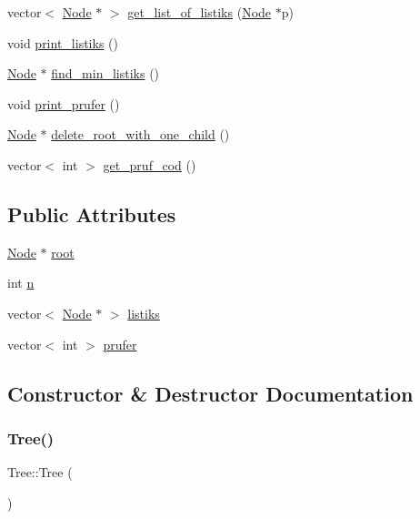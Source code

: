 \begin{DoxyCompactItemize}
\item 
vector$<$ \mbox{\hyperlink{class_node}{Node}} $\ast$ $>$ \mbox{\hyperlink{class_tree_a1feaf70139e6802c0b940c7c7fae9299}{get\+\_\+list\+\_\+of\+\_\+listiks}} (\mbox{\hyperlink{class_node}{Node}} $\ast$p)
\item 
void \mbox{\hyperlink{class_tree_ac2c37627e5e75085896379f2855d4306}{print\+\_\+listiks}} ()
\item 
\mbox{\hyperlink{class_node}{Node}} $\ast$ \mbox{\hyperlink{class_tree_ab640efe82cc69b28a9ddd61ac4410a89}{find\+\_\+min\+\_\+listiks}} ()
\item 
void \mbox{\hyperlink{class_tree_a5b7c6c2e01f8787b9ce3fb1684fc847b}{print\+\_\+prufer}} ()
\item 
\mbox{\hyperlink{class_node}{Node}} $\ast$ \mbox{\hyperlink{class_tree_ae0a6d8260dafecfd861410bfee87a868}{delete\+\_\+root\+\_\+with\+\_\+one\+\_\+child}} ()
\item 
vector$<$ int $>$ \mbox{\hyperlink{class_tree_a723ce7ab4f1030e95a959e11a22833e7}{get\+\_\+pruf\+\_\+cod}} ()
\end{DoxyCompactItemize}
\subsection*{Public Attributes}
\begin{DoxyCompactItemize}
\item 
\mbox{\hyperlink{class_node}{Node}} $\ast$ \mbox{\hyperlink{class_tree_ad8e46ce0aead5778cbdd784d1e370d5f}{root}}
\item 
int \mbox{\hyperlink{class_tree_af99cb1765b0249e5d79541313199786c}{n}}
\item 
vector$<$ \mbox{\hyperlink{class_node}{Node}} $\ast$ $>$ \mbox{\hyperlink{class_tree_ab4f6271eb3d30383287bbb634b90e3b5}{listiks}}
\item 
vector$<$ int $>$ \mbox{\hyperlink{class_tree_ac173ac7a6fb3d48b0c2226ec848966ee}{prufer}}
\end{DoxyCompactItemize}


\subsection{Constructor \& Destructor Documentation}
\mbox{\label{class_tree_ad376a7c639d857312f5de2ef47482f68}} 
\subsubsection{\texorpdfstring{Tree()}{Tree()}\hspace{0.1cm}{\footnotesize\ttfamily [1/2]}}
{\footnotesize\ttfamily Tree\+::\+Tree (\begin{DoxyParamCaption}{ }\end{DoxyParamCaption})}

